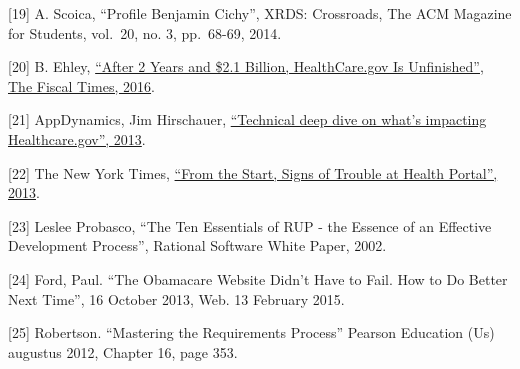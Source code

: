 \documentclass[]{article}
\begin{document}
{[}19{]} A. Scoica, ``Profile Benjamin Cichy'', XRDS: Crossroads, The
ACM Magazine for Students, vol.~20, no. 3, pp.~68-69, 2014.

{[}20{]} B. Ehley,
\href{http://www.thefiscaltimes.com/2015/03/05/After-2-Years-and-21-Billion-HealthCaregov-Unfinished}{``After
2 Years and \$2.1 Billion, HealthCare.gov Is Unfinished'', The Fiscal
Times, 2016}.

{[}21{]} AppDynamics, Jim Hirschauer,
\href{http://www.appdynamics.com/blog/apm/technical-deep-dive-whats-impacting-healthcare-gov/}{``Technical
deep dive on what's impacting Healthcare.gov'', 2013}.

{[}22{]} The New York Times,
\href{http://www.nytimes.com/2013/10/13/us/politics/from-the-start-signs-of-trouble-at-health-portal.html}{``From
the Start, Signs of Trouble at Health Portal'', 2013}.

{[}23{]} Leslee Probasco, ``The Ten Essentials of RUP - the Essence of
an Effective Development Process'', Rational Software White Paper, 2002.

{[}24{]} Ford, Paul. ``The Obamacare Website Didn't Have to Fail. How to
Do Better Next Time'', 16 October 2013, Web. 13 February 2015.

{[}25{]} Robertson. ``Mastering the Requirements Process'' Pearson
Education (Us) augustus 2012, Chapter 16, page 353.
\end{document}
